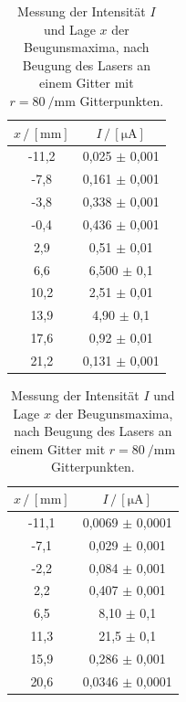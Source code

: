 \begin{table}[H]
    
    \centering
    \caption{Messung der Intensität $I$ und Lage $x$ der Beugunsmaxima, nach Beugung des Lasers an einem Gitter mit $r=\qty{80}{\per\milli\meter}$ Gitterpunkten.}
    \begin{tabular}{cc}
    \toprule
    $x \,/\, [\unit{\milli\meter}]$ &
    $I \,/\, [\unit{\micro\ampere}]$\\
    \midrule
    -11,2  & 0,025 $\pm$  0,001 \\
    -7,8   & 0,161 $\pm$  0,001 \\
    -3,8   & 0,338 $\pm$  0,001 \\
    -0,4   & 0,436 $\pm$  0,001 \\
    2,9    & 0,51  $\pm$  0,01  \\
    6,6    & 6,500 $\pm$  0,1   \\
    10,2   & 2,51  $\pm$  0,01  \\
    13,9   & 4,90  $\pm$  0,1   \\
    17,6   & 0,92  $\pm$  0,01  \\
    21,2   & 0,131 $\pm$  0,001 \\
    \bottomrule
    \end{tabular}
    \label{tab:gitter80}
\end{table}



\begin{table}[H]
    \centering
    \caption{Messung der Intensität $I$ und Lage $x$ der Beugunsmaxima, nach Beugung des Lasers an einem Gitter mit $r=\qty{80}{\per\milli\meter}$ Gitterpunkten.}
    \begin{tabular}{cc}
    \toprule
    $x \,/\, [\unit{\milli\meter}]$ &
    $I \,/\, [\unit{\micro\ampere}]$\\
    \midrule
    -11,1  & 0,0069 $\pm$ 0,0001 \\
    -7,1   & 0,029  $\pm$ 0,001  \\
    -2,2   & 0,084  $\pm$ 0,001  \\
    2,2   & 0,407  $\pm$ 0,001  \\
    6,5   & 8,10   $\pm$ 0,1    \\
    11,3   & 21,5   $\pm$ 0,1    \\
    15,9   & 0,286  $\pm$ 0,001  \\
    20,6   & 0,0346 $\pm$ 0,0001 \\
    \bottomrule
    \end{tabular}
    \label{tab:gitter100}
  \end{table}


















\newpage